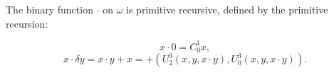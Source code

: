 The binary function $\cdot$ on $\omega$ is primitive recursive, defined by the primitive recursion:

$$x \cdot 0 = C_0^1 x,$$
$$x \cdot \delta y = x \cdot y + x = +(U_2^3(x, y, x \cdot y), U_0^3(x, y, x \cdot y)).$$
